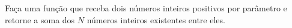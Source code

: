 
\question[10]

Faça uma função que receba dois números inteiros positivos por parâmetro e retorne a soma dos $N$ números inteiros existentes entre eles.